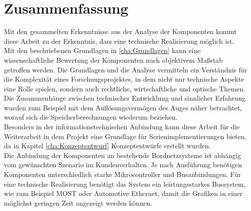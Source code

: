 \chapter{Zusammenfassung}
\label{cha:zusammenfassung}
Mit den gesammelten Erkenntnisse aus der Analyse der Komponenten kommt diese Arbeit zu der Erkenntnis, dass eine technische Realisierung möglich ist. \\
Mit den beschriebenen Grundlagen in \ref{cha:Grundlagen} kann eine wissenschaftliche Bewertung der Komponenten nach objektivem Maßstab getroffen werden. Die Grundlagen und die Analyse vermitteln ein Verständnis für die Komplexität eines Forschungsprojektes, in dem nicht nur technische Aspekte eine Rolle spielen, sondern auch rechtliche, wirtschaftliche und optische Themen. \\
Die Zusammenhänge zwischen technischer Entwicklung und sinnlicher Erfahrung wurden zum Beispiel mit dem Auflösungsvermögen des Auges näher betrachtet, worauf sich die Speicherberechnungen wiederum beziehen. \\
Besonders in der informationstechnischen Anbindung kann diese Arbeit für die Weiterarbeit in dem Projekt eine Grundlage für Serienimplementierungen bieten, da in Kapitel \ref{cha:Konzeptentwurf} Konzeptentwürfe erstellt wurden. \\
Die Anbindung der Komponenten an bestehende Bordnetzsysteme ist abhängig vom gewünschten Szenario im Kundenverhalten. Je nach Ausführung benötigen Komponenten unterschiedlich starke Mikrocontroller und Busanbindungen.
Für eine technische Realisierung benötigt das System ein leistungsstarkes Bussystem, wie zum Beispiel MOST oder Automotive Ethernet, damit die Grafiken in einer möglichst geringen Zeit angezeigt werden können. 
